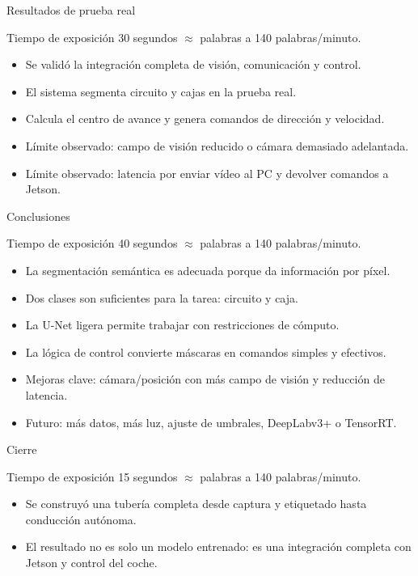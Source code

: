 \documentclass[aspectratio=169]{beamer}
\newcommand{\timing}[2]{%
  \begin{block}{Tiempo de exposici\'on}
  \small #1 segundos \quad $\approx$ \quad #2 palabras a 140 palabras/minuto.
  \end{block}
}
\begin{document}
\begin{frame}{Resultados de prueba real}
\timing{30}{70}
\begin{itemize}
  \item Se valid\'o la integraci\'on completa de visi\'on, comunicaci\'on y control.
  \item El sistema segmenta circuito y cajas en la prueba real.
  \item Calcula el centro de avance y genera comandos de direcci\'on y velocidad.
  \item L\'imite observado: campo de visi\'on reducido o c\'amara demasiado adelantada.
  \item L\'imite observado: latencia por enviar v\'ideo al PC y devolver comandos a Jetson.
\end{itemize}
\end{frame}

\begin{frame}{Conclusiones}
\timing{40}{93}
\begin{itemize}
  \item La segmentaci\'on sem\'antica es adecuada porque da informaci\'on por p\'ixel.
  \item Dos clases son suficientes para la tarea: circuito y caja.
  \item La U-Net ligera permite trabajar con restricciones de c\'omputo.
  \item La l\'ogica de control convierte m\'ascaras en comandos simples y efectivos.
  \item Mejoras clave: c\'amara/posici\'on con m\'as campo de visi\'on y reducci\'on de latencia.
  \item Futuro: m\'as datos, m\'as luz, ajuste de umbrales, DeepLabv3+ o TensorRT.
\end{itemize}
\end{frame}

\begin{frame}{Cierre}
\timing{15}{35}
\begin{itemize}
  \item Se construy\'o una tuber\'ia completa desde captura y etiquetado hasta conducci\'on aut\'onoma.
  \item El resultado no es solo un modelo entrenado: es una integraci\'on completa con Jetson y control del coche.
\end{itemize}
\end{frame}
\end{document}
